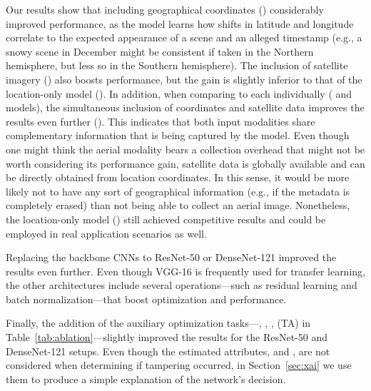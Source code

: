 \documentclass[journal]{IEEEtran}
\begin{document}
        
        Our results show that including geographical coordinates () considerably improved performance, as the model learns how shifts in latitude and longitude correlate to the expected appearance of a scene and an alleged timestamp (e.g., a snowy scene in December might be consistent if taken in the Northern hemisphere, but less so in the Southern hemisphere). The inclusion of satellite imagery () also boosts performance, but the gain is slightly inferior to that of the location-only model (). In addition, when comparing to each individually ( and  models), the simultaneous inclusion of coordinates and satellite data improves the results even further (). This indicates that both input modalities share complementary information that is being captured by the model. Even though one might think the aerial modality bears a collection overhead that might not be worth considering its performance gain, satellite data is globally available and can be directly obtained from location coordinates. In this sense, it would be more likely not to have any sort of geographical information (e.g., if the metadata is completely erased) than not being able to collect an aerial image. Nonetheless, the location-only model () still achieved competitive results and could be employed in real application scenarios as well.
        
        Replacing the backbone CNNs to ResNet-50 or DenseNet-121 improved the results even further. Even though VGG-16 is frequently used for transfer learning, the other architectures include several operations---such as residual learning and batch normalization---that boost optimization and performance.
        
        Finally, the addition of the auxiliary optimization tasks---, , ,  (TA) in Table~\ref{tab:ablation}---slightly improved the results for the ResNet-50 and DenseNet-121 setups. Even though the estimated attributes,  and , are not considered when determining if tampering occurred, in Section~\ref{sec:xai} we use them to produce a simple explanation of the network's decision.
        
\end{document}
